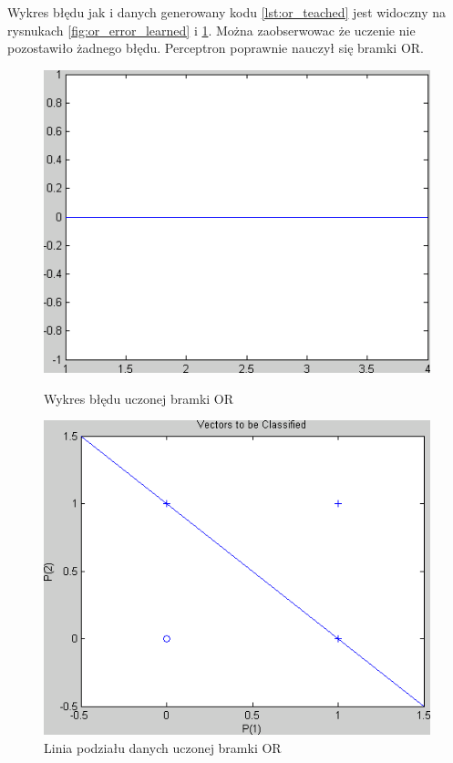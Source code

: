 \documentclass[pointlessnumbers, abstracton, headsepline, a4paper]{scrartcl}
\begin{document}
\begin{center}
\begin{minipage}{0.5\textwidth}
\lstset{captionpos=b,caption=Kod uczonej bramki OR,label=lst:or_teached}

\end{minipage}
\end{center}

Wykres błędu jak i danych generowany kodu \ref{lst:or_teached} jest widoczny na rysnukach \ref{fig:or_error_learned} i \ref{fig:or_data_learned}. Można zaobserwowac że uczenie nie pozostawiło żadnego błędu. Perceptron poprawnie nauczył się bramki OR.

\begin{figure}[h]
\centering
\begin{minipage}{0.4\textwidth}
\includegraphics[scale=0.4]{figures/or_error_learned.png}
\caption{\label{fig:or_error_learned}Wykres błędu uczonej bramki OR}
\end{minipage}
\qquad
\begin{minipage}{0.4\textwidth}
\includegraphics[scale=0.4]{figures/or_data_learned.png}
\caption{\label{fig:or_data_learned}Linia podziału danych uczonej bramki OR}
\end{minipage}
\end{figure}
\end{document}
